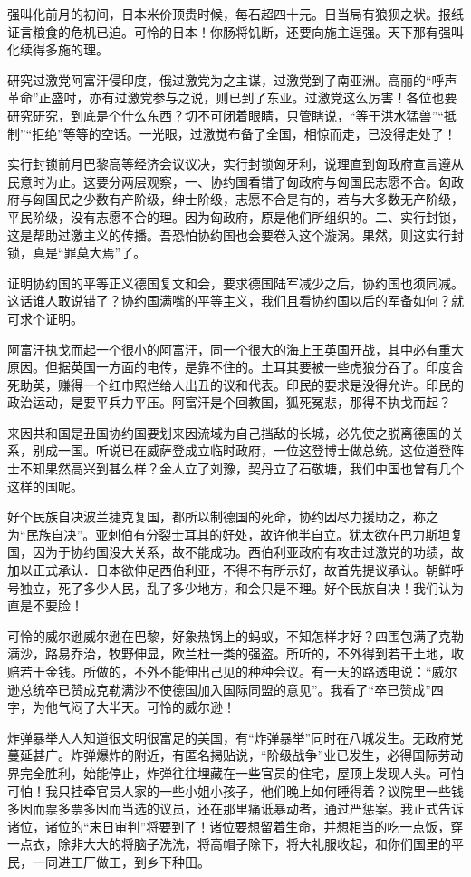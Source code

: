 强叫化前月的初间，日本米价顶贵时候，每石超四十元。日当局有狼狈之状。报纸证言粮食的危机已迫。可怜的日本！你肠将饥断，还要向施主逞强。天下那有强叫化续得多施的理。

研究过激党阿富汗侵印度，俄过激党为之主谋，过激党到了南亚洲。高丽的“呼声革命”正盛吋，亦有过激党参与之说，则已到了东亚。过激党这么厉害！各位也要研究研究，到底是个什么东西？切不可闭着眼睛，只管瞎说，“等于洪水猛兽”“抵制”“拒绝”等等的空话。一光眼，过激觉布备了全国，相惊而走，已没得走处了！

实行封锁前月巴黎高等经济会议议决，实行封锁匈牙利，说理直到匈政府宣言遵从民意时为止。这要分两层观察，一、协约国看错了匈政府与匈国民志愿不合。匈政府与匈国民之少数有产阶级，绅士阶级，志愿不合是有的，若与大多数无产阶级，平民阶级，没有志愿不合的理。因为匈政府，原是他们所组织的。二、实行封锁，这是帮助过激主义的传播。吾恐怕协约国也会要卷入这个漩涡。果然，则这实行封锁，真是“罪莫大焉”了。

证明协约国的平等正义德国复文和会，要求德国陆军减少之后，协约国也须同减。这话谁人敢说错了？协约国满嘴的平等主义，我们且看协约国以后的军备如何？就可求个证明。

阿富汗执戈而起一个很小的阿富汗，同一个很大的海上王英国开战，其中必有重大原因。但据英国一方面的电传，是靠不住的。土耳其要被一些虎狼分吞了。印度舍死助英，赚得一个红巾照烂给人出丑的议和代表。印民的要求是没得允许。印民的政治运动，是要平兵力平压。阿富汗是个回教国，狐死冤悲，那得不执戈而起？

来因共和国是丑国协约国要划来因流域为自己挡敌的长城，必先使之脱离德国的关系，别成一国。听说已在威萨登成立临时政府，一位这登博士做总统。这位道登阵士不知果然高兴到甚么样？金人立了刘豫，契丹立了石敬塘，我们中国也曾有几个这样的国呢。

好个民族自决波兰捷克复国，都所以制德国的死命，协约因尽力援助之，称之为“民族自决”。亚刺伯有分裂士耳其的好处，故许他半自立。犹太欲在巴力斯坦复国，因为于协约国没大关系，故不能成功。西伯利亚政府有攻击过激党的功绩，故加以正式承认．日本欲伸足西伯利亚，不得不有所示好，故首先提议承认。朝鲜呼号独立，死了多少人民，乱了多少地方，和会只是不理。好个民族自决！我们认为直是不要脸！

可怜的威尔逊威尔逊在巴黎，好象热锅上的蚂蚁，不知怎样才好？四围包满了克勒满沙，路易乔治，牧野伸显，欧兰杜一类的强盗。所听的，不外得到若干土地，收赔若干金钱。所做的，不外不能伸出己见的种种会议。有一天的路透电说：“威尔逊总统卒已赞成克勒满沙不使德国加入国际同盟的意见”。我看了“卒已赞成”四字，为他气闷了大半天。可怜的威尔逊！

炸弹暴举人人知道很文明很富足的美国，有“炸弹暴举”同时在八城发生。无政府党蔓延甚广。炸弹爆炸的附近，有匿名揭贴说，“阶级战争”业已发生，必得国际劳动界完全胜利，始能停止，炸弹往往埋藏在一些官员的住宅，屋顶上发现人头。可怕可怕！我只挂牵官员人家的一些小姐小孩子，他们晚上如何睡得着？议院里一些钱多因而票多票多因而当选的议员，还在那里痛诋暴动者，通过严惩案。我正式告诉诸位，诸位的“末日审判”将要到了！诸位要想留着生命，并想相当的吃一点饭，穿一点衣，除非大大的将脑子洗洗，将高帽子除下，将大礼服收起，和你们国里的平民，一同进工厂做工，到乡下种田。

